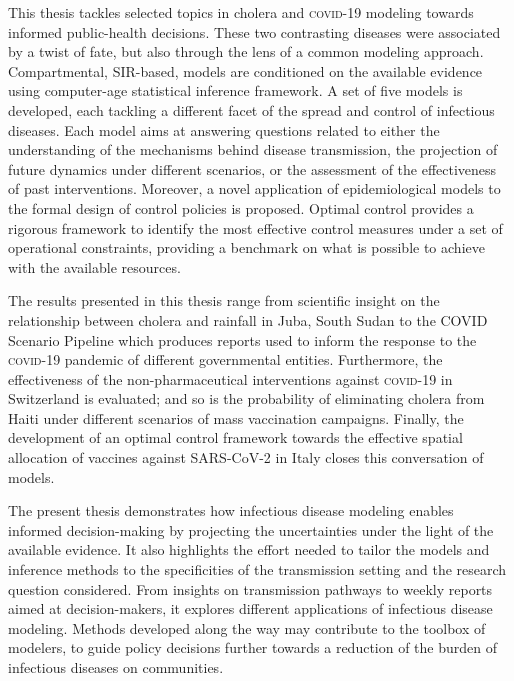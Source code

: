 This thesis tackles selected topics in cholera and \textsc{covid}-19 modeling towards informed public-health decisions. These two contrasting diseases were associated by a twist of fate, but also through the lens of a common modeling approach.  Compartmental, SIR-based, models are conditioned on the available evidence using computer-age statistical inference framework. A set of five models is developed, each tackling a different facet of the spread and control of infectious diseases. Each model aims at answering questions related to either the understanding of the mechanisms behind disease transmission, the projection of future dynamics under different scenarios, or the assessment of the effectiveness of past interventions. Moreover, a novel application of epidemiological models to the formal design of control policies is proposed. Optimal control provides a rigorous framework to identify the most effective control measures under a set of operational constraints, providing a benchmark on what is possible to achieve with the available resources.

The results presented in this thesis range from scientific insight on the relationship between cholera and rainfall in Juba, South Sudan to the COVID Scenario Pipeline which produces reports used to inform the response to the \textsc{covid}-19 pandemic of different governmental entities. Furthermore, the effectiveness of the non-pharmaceutical interventions against \textsc{covid}-19 in Switzerland is evaluated; and so is the probability of eliminating cholera from Haiti under different scenarios of mass vaccination campaigns. Finally, the development of an optimal control framework towards the effective spatial allocation of vaccines against SARS-CoV-2 in Italy closes this conversation of models.

The present thesis demonstrates how infectious disease modeling enables informed decision-making by projecting the uncertainties under the light of the available evidence. It also highlights the effort needed to tailor the models and inference methods to the specificities of the transmission setting and the research question considered. From insights on transmission pathways to weekly reports aimed at decision-makers, it explores different applications of infectious disease modeling. Methods developed along the way may contribute to the toolbox of modelers, to guide policy decisions further towards a reduction of the burden of infectious diseases on communities.

 \vspace{-.5cm}
